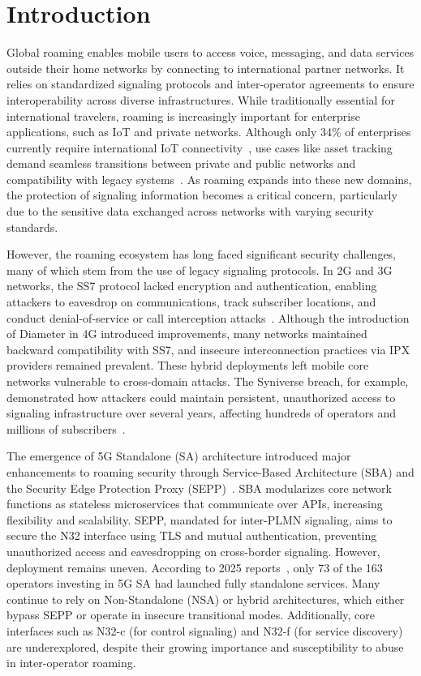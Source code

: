\documentclass[journal,article,submit,moreauthors,pdftex]{Definitions/tsp}
\begin{document}
\section{Introduction} \label{sect:s1}
Global roaming enables mobile users to access voice, messaging, and data services outside their home networks by connecting to international partner networks. It relies on standardized signaling protocols and inter-operator agreements to ensure interoperability across diverse infrastructures. While traditionally essential for international travelers, roaming is increasingly important for enterprise applications, such as IoT and private networks. Although only 34\% of enterprises currently require international IoT connectivity~\cite{RadarRoamingPostCovid2021}, use cases like asset tracking demand seamless transitions between private and public networks and compatibility with legacy systems~\cite{Private5GNetworks2024}. As roaming expands into these new domains, the protection of signaling information becomes a critical concern, particularly due to the sensitive data exchanged across networks with varying security standards.

However, the roaming ecosystem has long faced significant security challenges, many of which stem from the use of legacy signaling protocols. In 2G and 3G networks, the SS7 protocol lacked encryption and authentication, enabling attackers to eavesdrop on communications, track subscriber locations, and conduct denial-of-service or call interception attacks~\cite{raoWeKnowWhere2016,kirchgaessnerIsraeliSpyFirm2020,ullahSS7VulnerabilitiesSurvey2020}. Although the introduction of Diameter in 4G introduced improvements, many networks maintained backward compatibility with SS7, and insecure interconnection practices via IPX providers remained prevalent. These hybrid deployments left mobile core networks vulnerable to cross-domain attacks. The Syniverse breach, for example, demonstrated how attackers could maintain persistent, unauthorized access to signaling infrastructure over several years, affecting hundreds of operators and millions of subscribers~\cite{SyniverseBreach2021}.

The emergence of 5G Standalone (SA) architecture introduced major enhancements to roaming security through Service-Based Architecture (SBA) and the Security Edge Protection Proxy (SEPP)~\cite{Specification33501,5GRoamingSecurity,5GSRoamingGuidelinesV12}. SBA modularizes core network functions as stateless microservices that communicate over APIs, increasing flexibility and scalability. SEPP, mandated for inter-PLMN signaling, aims to secure the N32 interface using TLS and mutual authentication, preventing unauthorized access and eavesdropping on cross-border signaling. However, deployment remains uneven. According to 2025 reports~\cite{5GStandaloneApril2025}, only 73 of the 163 operators investing in 5G SA had launched fully standalone services. Many continue to rely on Non-Standalone (NSA) or hybrid architectures, which either bypass SEPP or operate in insecure transitional modes. Additionally, core interfaces such as N32-c (for control signaling) and N32-f (for service discovery) are underexplored, despite their growing importance and susceptibility to abuse in inter-operator roaming.
\end{document}
